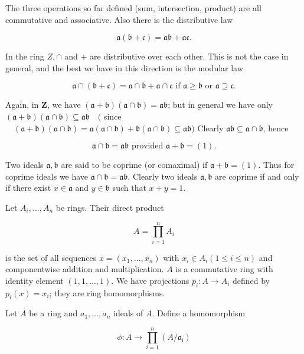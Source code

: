 \documentclass{standalone}
\theoremstyle{definition}
\theoremstyle{remark}
\begin{document}
The three operations so far defined (sum, intersection, product) are all commutative and associative. Also there is the distributive law

\[
\mathfrak{a}(\mathfrak{b}+\mathfrak{c})=\mathfrak{a} \mathfrak{b}+\mathfrak{a} \mathfrak{c} .
\]

In the ring $Z, \cap$ and + are distributive over each other. This is not the case in general, and the best we have in this direction is the modular law

\[
\mathfrak{a} \cap(\mathfrak{b}+\mathfrak{c})=\mathfrak{a} \cap \mathfrak{b}+\mathfrak{a} \cap \mathfrak{c} \text { if } \mathfrak{a} \geq \mathfrak{b} \text { or } \mathfrak{a} \supseteq \mathfrak{c} .
\]

Again, in $\mathbf{Z}$, we have $(\mathfrak{a}+\mathfrak{b})(\mathfrak{a} \cap \mathfrak{b})=\mathfrak{a} \mathfrak{b}$; but in general we have only $(\mathfrak{a}+\mathfrak{b})(\mathfrak{a} \cap \mathfrak{b}) \subseteq \mathfrak{a} \mathfrak{b} \quad($ since $\quad(\mathfrak{a}+\mathfrak{b})(\mathfrak{a} \cap \mathfrak{b})=\mathfrak{a}(\mathfrak{a} \cap \mathfrak{b})+\mathfrak{b}(\mathfrak{a} \cap \mathfrak{b}) \subseteq \mathfrak{a} \mathfrak{b})$ Clearly $\mathfrak{a} \mathfrak{b} \subseteq \mathfrak{a} \cap \mathfrak{b}$, hence

\[
\mathfrak{a} \cap \mathfrak{b}=\mathfrak{a} \mathfrak{b} \text { provided } \mathfrak{a}+\mathfrak{b}=(1) .
\]

Two ideals $\mathfrak{a}, \mathfrak{b}$ are said to be coprime (or comaximal) if $\mathfrak{a}+\mathfrak{b}=(1)$. Thus for coprime ideals we have $\mathfrak{a} \cap \mathfrak{b}=\mathfrak{a} \mathfrak{b}$. Clearly two ideals $\mathfrak{a}, \mathfrak{b}$ are coprime if and only if there exist $x \in \mathfrak{a}$ and $y \in \mathfrak{b}$ such that $x+y=1$.

Let $A_{i}, \ldots, A_{n}$ be rings. Their direct product

\[
A=\prod_{i=1}^{n} A_{i}
\]

is the set of all sequences $x=\left(x_{1}, \ldots, x_{n}\right)$ with $x_{i} \in A_{i}(1 \leqslant i \leqslant n)$ and componentwise addition and multiplication. $A$ is a commutative ring with identity element $(1,1, \ldots, 1)$. We have projections $p_{i}: A \rightarrow A_{i}$ defined by $p_{i}(x)=x_{i}$; they are ring homomorphisms.

Let $A$ be a ring and $a_{1}, \ldots, a_{n}$ ideals of $A$. Define a homomorphism

\[
\phi: A \rightarrow \prod_{i=1}^{n}\left(A / \mathfrak{a}_{\mathfrak{i}}\right)
\]
\end{document}
